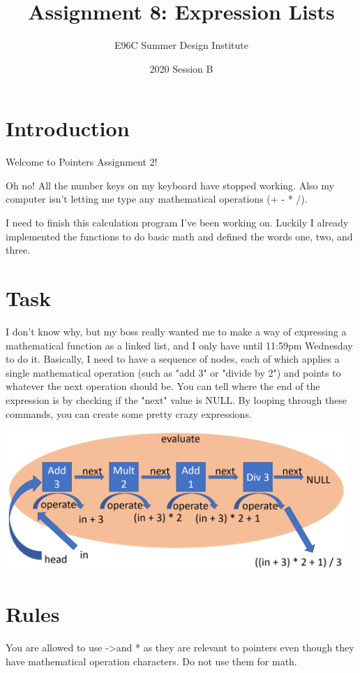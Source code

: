 \documentclass[12pt]{article}
\title{Assignment 8: Expression Lists}
\author{E96C Summer Design Institute}
\date{2020 Session B}
\begin{document}
\maketitle

\section{Introduction}
Welcome to Pointers Assignment 2!

Oh no! All the number keys on my keyboard have stopped working. Also my computer isn't letting me type any mathematical operations (+ - * /).

I need to finish this calculation program I've been working on. Luckily I already implemented the functions to do basic math and defined the words one, two, and three.


\section{Task}
I don't know why, but my boss really wanted me to make a way of expressing a mathematical function as a linked list, and I only have until 11:59pm Wednesday to do it. Basically, I need to have a sequence of nodes, each of which applies a single mathematical operation (such as "add 3" or "divide by 2") and points to whatever the next operation should be. You can tell where the end of the expression is by checking if the "next" value is NULL. By looping through these commands, you can create some pretty crazy expressions.

\begin{center}
\includegraphics[width=13cm]{images/betterDiagram.png}
\end{center}

\section{Rules}

You are allowed to use -\textgreater  and * as they are relevant to pointers even though they have mathematical operation characters. Do not use them for math.
\end{document}
